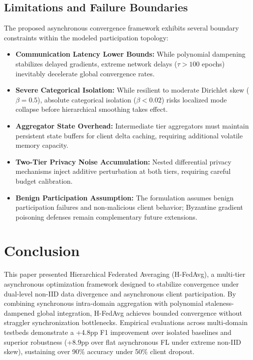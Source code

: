 \documentclass[conference]{IEEEtran}
\begin{document}
\subsection{Limitations and Failure Boundaries}
The proposed asynchronous convergence framework exhibits several boundary constraints within the modeled participation topology:
\begin{itemize}
    \item \textbf{Communication Latency Lower Bounds:} While polynomial dampening stabilizes delayed gradients, extreme network delays ($\tau > 100$ epochs) inevitably decelerate global convergence rates.
    \item \textbf{Severe Categorical Isolation:} While resilient to moderate Dirichlet skew ($\beta = 0.5$), absolute categorical isolation ($\beta < 0.02$) risks localized mode collapse before hierarchical smoothing takes effect.
    \item \textbf{Aggregator State Overhead:} Intermediate tier aggregators must maintain persistent state buffers for client delta caching, requiring additional volatile memory capacity.
    \item \textbf{Two-Tier Privacy Noise Accumulation:} Nested differential privacy mechanisms inject additive perturbation at both tiers, requiring careful budget calibration.
    \item \textbf{Benign Participation Assumption:} The formulation assumes benign participation failures and non-malicious client behavior; Byzantine gradient poisoning defenses remain complementary future extensions.
\end{itemize}

\section{Conclusion}

This paper presented Hierarchical Federated Averaging (H-FedAvg), a multi-tier asynchronous optimization framework designed to stabilize convergence under dual-level non-IID data divergence and asynchronous client participation. By combining synchronous intra-domain aggregation with polynomial staleness-dampened global integration, H-FedAvg achieves bounded convergence without straggler synchronization bottlenecks. Empirical evaluations across multi-domain testbeds demonstrate a +4.8pp F1 improvement over isolated baselines and superior robustness (+8.9pp over flat asynchronous FL under extreme non-IID skew), sustaining over 90\% accuracy under 50\% client dropout.
\end{document}

